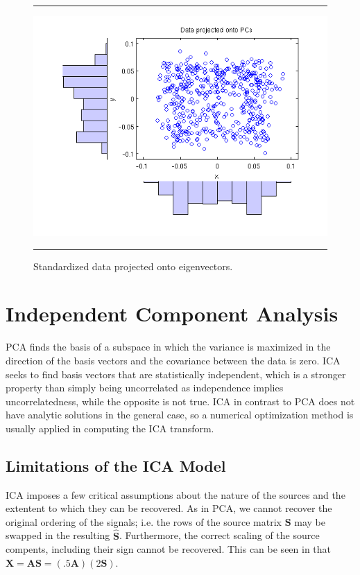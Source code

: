 \documentclass[11pt, oneside, a4paper]{report}
\begin{document}
\begin{figure}
  \centering
  \hrule
  \includegraphics[width = .9\textwidth]{Figures/pca_eig_projection}
  \hrule
  \caption{Standardized data projected onto eigenvectors.}
\end{figure}

\chapter{Independent Component Analysis}

PCA finds the basis of a subspace in which the variance is
maximized in the direction of the basis vectors and the covariance
between the data is zero. ICA seeks to find basis
vectors that are statistically independent, which is a stronger
property than simply being uncorrelated as independence implies
uncorrelatedness, while the opposite is not true. ICA in contrast to PCA does not have analytic solutions in the general case, 
so a numerical optimization method is usually applied in computing the ICA transform.

\section{Limitations of the ICA Model}\label{ICA_restrictions}

ICA imposes a few critical assumptions about the nature of the sources
and the extentent to which they can be recovered. As in PCA, we cannot
recover the original ordering of the signals; i.e. the rows of the
source matrix $\boldsymbol{S}$ may be swapped in the resulting
$\hat{\boldsymbol{S}}$. Furthermore, the correct scaling of the source
compents, including their sign cannot be recovered. This can be seen
in that $\boldsymbol{X} = \boldsymbol{A}\boldsymbol{S} = (.5
\boldsymbol{A})(2 \boldsymbol{S})$.
\end{document}
